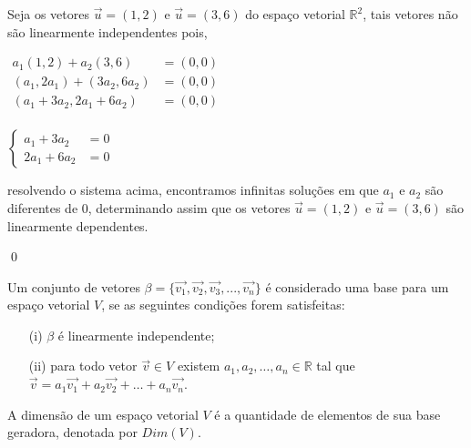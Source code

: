     \begin{exemplo}
        Seja os vetores $\vec{u} = (1,2)$ e $\vec{u} = (3,6)$ do espaço vetorial $\mathbb{R}^{2}$, tais vetores não são linearmente independentes pois,
    
        \begin{center}
            $\begin{array}{rl}
                a_1 (1,2) + a_2 (3,6) &= (0,0)\\
                (a_1,2 a_1) + (3 a_2, 6 a_2) &= (0,0)\\
                (a_1 + 3 a_2, 2 a_1 + 6 a_2) &= (0,0)\\
            \end{array}$
        \end{center}
        
        \begin{center}
            $\begin{cases}
                a_1 + 3 a_2   &= 0\\
                2 a_1 + 6 a_2 &= 0
            \end{cases}$
        \end{center}
    
        \noindent
        resolvendo o sistema acima, encontramos infinitas soluções em que $a_1$ e $a_2$ são diferentes de 0, determinando assim que os vetores $\vec{u} = (1,2)$ e $\vec{u} = (3,6)$ são linearmente dependentes.
    
    \qed
    \end{exemplo}
    
\begin{definition}
    Um conjunto de vetores $\beta = \{ \vec{v_1}, \vec{v_2}, \vec{v_3},...,\vec{v_n} \}$ é considerado uma base para um espaço vetorial $V$, se as seguintes condições forem satisfeitas:
    \begin{itemize}
        \item[(i)] $\beta$ é linearmente independente;
        \item[(ii)] para todo vetor $\vec{v}\in V$ existem $a_1, a_2, \ldots, a_n\in \mathbb{R}$ tal que $\vec{v}=a_1\vec{v_1}+a_2\vec{v_2}+\ldots+a_n\vec{v_n}$.
    \end{itemize}
\end{definition}

\begin{definition}
    A dimensão de um espaço vetorial $V$ é a quantidade de elementos de sua base geradora, denotada por $Dim(V)$.
\end{definition}

